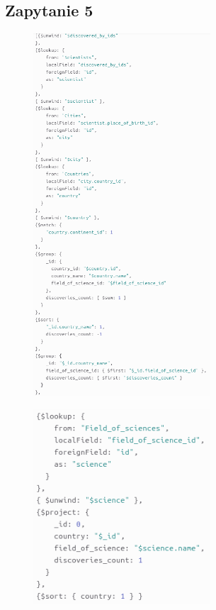 \documentclass[11pt]{article}
\begin{document}
\newpage
	\subsection{Zapytanie 5}
		\begin{figure}[!ht]
			\begin{center}
				\includegraphics[width=250px]{m5_1.png}
			\end{center}
		\end{figure}

\newpage
		\begin{figure}[!ht]
			\begin{center}
				\includegraphics[width=250px]{m5_2.png}
			\end{center}
		\end{figure}
\end{document}
